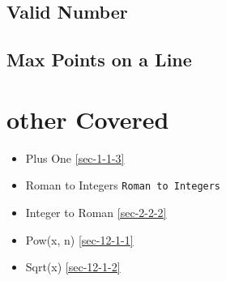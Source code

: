 \documentclass[12pt]{book}
\begin{document}
\subsection{Valid Number}
\label{sec-21-3-1}
\subsection{Max Points on a Line}
\label{sec-21-3-2}
\section{other Covered}
\label{sec-21-4}
\begin{itemize}
\item Plus One
\ref{sec-1-1-3}
\item Roman to Integers
\texttt{Roman to Integers}
\item Integer to Roman
\ref{sec-2-2-2}
\item Pow(x, n)
\ref{sec-12-1-1}
\item Sqrt(x)
\ref{sec-12-1-2}
\end{itemize}
\end{document}

